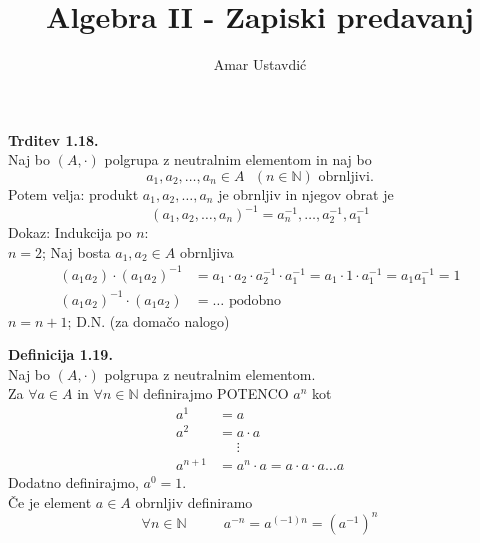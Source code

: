 \documentclass[12pt]{article}
\title{Algebra II - Zapiski predavanj}
\date{}
\author{Amar Ustavdić}
\begin{document}
\maketitle
\clearpage 

\tableofcontents
\clearpage



\clearpage



\clearpage



\noindent
\textbf{Trditev 1.18.} \\
Naj bo $(A, \cdot)$ polgrupa z neutralnim elementom in naj bo 
$$a_1, a_2, \dots, a_n \in A \text{ } (n \in \mathbb{N}) \text{ obrnljivi.}$$
Potem velja: produkt $a_1, a_2, \dots, a_n$ je obrnljiv in njegov obrat je 
$$(a_1, a_2, \dots, a_n)^{-1} = a_n^{-1}, \dots, a_2^{-1}, a_1^{-1}$$
Dokaz: Indukcija po $n$: \\
$n = 2$; Naj bosta $a_1, a_2 \in A$ obrnljiva
\begin{align*}
    (a_1a_2)\cdot (a_1a_2)^{-1} &= a_1 \cdot a_2 \cdot a_2^{-1} \cdot a_1^{-1} = a_1 \cdot 1 \cdot a_1^{-1} = a_1a_1^{-1} = 1 \\
    (a_1a_2)^{-1} \cdot (a_1a_2) &= \dots \text{ podobno }
\end{align*}
$n = n + 1$; D.N. (za domačo nalogo)



\vspace*{24pt}


\noindent
\textbf{Definicija 1.19.} \\
Naj bo $(A, \cdot)$ polgrupa z neutralnim elementom. \\
Za $\forall a \in A$ in $\forall n \in \mathbb{N}$ definirajmo POTENCO $a^n$ kot
\begin{align*}
    a^1 &= a \\
    a^2 &= a \cdot a \\
    &\phantom{=} \vdots \\
    a^{n+1} &= a^n \cdot a = a \cdot a \cdot a \dots a 
\end{align*}
Dodatno definirajmo, $a^0 = 1$. \\
Če je element $a \in A$ obrnljiv definiramo
$$
\forall n \in \mathbb{N} \text{ } \text{ } \text{ } \text{ } a^{-n} = a^{(-1)n} = (a^{-1})^n
$$



\vspace*{24pt}
\end{document}

